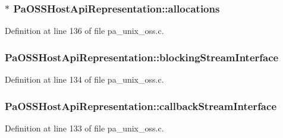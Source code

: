 \subsubsection[{\texorpdfstring{allocations}{allocations}}]{$\ast$ Pa\+O\+S\+S\+Host\+Api\+Representation\+::allocations}\hypertarget{struct_pa_o_s_s_host_api_representation_a415955a7a7bc861ff215e58958f23184}{}\label{struct_pa_o_s_s_host_api_representation_a415955a7a7bc861ff215e58958f23184}


Definition at line 136 of file pa\+\_\+unix\+\_\+oss.\+c.

\subsubsection[{\texorpdfstring{blocking\+Stream\+Interface}{blockingStreamInterface}}]{ Pa\+O\+S\+S\+Host\+Api\+Representation\+::blocking\+Stream\+Interface}\hypertarget{struct_pa_o_s_s_host_api_representation_a95f6c2c3b94b920664c06014c68bbfc6}{}\label{struct_pa_o_s_s_host_api_representation_a95f6c2c3b94b920664c06014c68bbfc6}


Definition at line 134 of file pa\+\_\+unix\+\_\+oss.\+c.

\subsubsection[{\texorpdfstring{callback\+Stream\+Interface}{callbackStreamInterface}}]{ Pa\+O\+S\+S\+Host\+Api\+Representation\+::callback\+Stream\+Interface}\hypertarget{struct_pa_o_s_s_host_api_representation_ad69a240ffe51786e65a14f9f004d7793}{}\label{struct_pa_o_s_s_host_api_representation_ad69a240ffe51786e65a14f9f004d7793}


Definition at line 133 of file pa\+\_\+unix\+\_\+oss.\+c.

